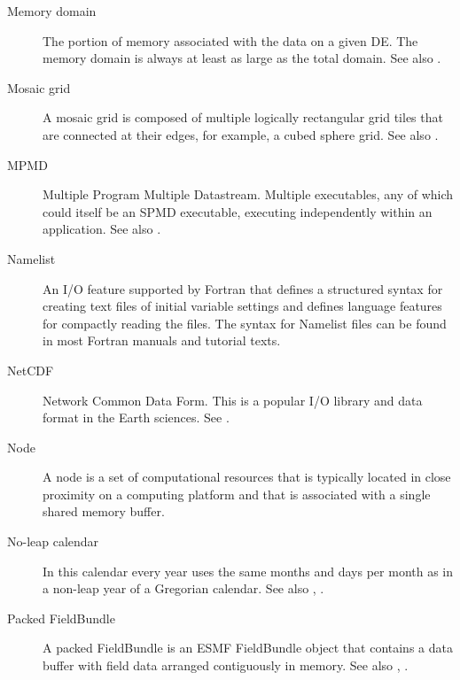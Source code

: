 \begin{description}
\label{glos:MemDomain} 
\item[Memory domain] 
  The portion of memory associated with the data on a given DE.  
  The memory domain is always at least 
  as large as the total domain.  See also .

\label{glos:MosaicGrid}
\item[Mosaic grid]
  A mosaic grid is composed of multiple logically rectangular
  grid tiles that are connected at their edges, for example, a cubed sphere
  grid.  See also .

\label{glos:MPMD} 
\item[MPMD] 
  Multiple Program Multiple Datastream.
  Multiple executables, any of which could itself be an SPMD
  executable, executing independently within an application. 
  See also .

\label{glos:Namelist}
\item[Namelist]
An I/O feature supported by Fortran that
defines a structured syntax for creating text files of initial variable
settings and defines language features for compactly reading the files.
The syntax for Namelist files can be found in most Fortran manuals 
and tutorial texts.

\label{glos:NetCDF}
\item[NetCDF]
  Network Common Data Form.  This is a popular I/O library and data format
in the Earth sciences. See . 

\label{glos:Node} 
\item[Node] 
  A node is a set of computational resources
  that is typically located in close proximity on a computing platform
  and that is associated with a single shared memory buffer.

\label{glos:NoLeap} 
\item [No-leap calendar] 
  In this calendar every year uses the same months 
  and days per month as in a non-leap year of a Gregorian calendar.  See
  also , .

\label{glos:PackedFieldBundle} 
\item[Packed FieldBundle] 
  A packed FieldBundle is an 
  ESMF FieldBundle object that contains
  a data buffer with field data arranged contiguously in memory. See 
  also , .


\end{description}
